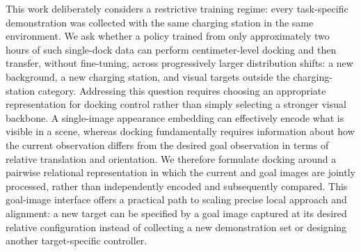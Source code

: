 \documentclass[letterpaper, 10 pt, conference]{IEEEtran}  %
\begin{document}
This work deliberately considers a restrictive training regime: every task-specific demonstration was collected with the same charging station in the same environment. We ask whether a policy trained from only approximately two hours of such single-dock data can perform centimeter-level docking and then transfer, without fine-tuning, across progressively larger distribution shifts: a new background, a new charging station, and visual targets outside the charging-station category. Addressing this question requires choosing an appropriate representation for docking control rather than simply selecting a stronger visual backbone. A single-image appearance embedding can effectively encode what is visible in a scene, whereas docking fundamentally requires information about how the current observation differs from the desired goal observation in terms of relative translation and orientation. We therefore formulate docking around a pairwise relational representation in which the current and goal images are jointly processed, rather than independently encoded and subsequently compared. This goal-image interface offers a practical path to scaling precise local approach and alignment: a new target can be specified by a goal image captured at its desired relative configuration instead of collecting a new demonstration set or designing another target-specific controller.
\end{document}
